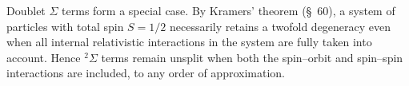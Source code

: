 Doublet $\Sigma$ terms form a special case. By Kramers' theorem (\S~60), a system of particles with total spin $S=1/2$ necessarily retains a twofold degeneracy even when all internal relativistic interactions in the system are fully taken into account. Hence ${}^2\Sigma$ terms remain unsplit when both the spin--orbit and spin--spin interactions are included, to any order of approximation.
